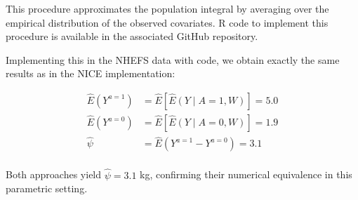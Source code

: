 \documentclass[12pt]{article}
\numberwithin{equation}{section}
\begin{document}
This procedure approximates the population integral by averaging over the empirical distribution of the observed covariates. R code to implement this procedure is available in the associated GitHub repository.

Implementing this in the NHEFS data with code, we obtain exactly the same results as in the NICE implementation:

\begin{align*}
\hat{E}(Y^{a = 1}) & = \hat{E}[\hat{E}(Y \mid A = 1, W)] = 5.0 \\
  \hat{E}(Y^{a = 0}) & = \hat{E}[\hat{E}(Y \mid A = 0, W)] = 1.9 \\
	\hat{\psi} & = \hat{E}(Y^{a = 1} - Y^{a = 0}) = 3.1 \\
\end{align*}

Both approaches yield $\hat{\psi} = 3.1$ kg, confirming their numerical equivalence in this parametric setting. 
\end{document}
